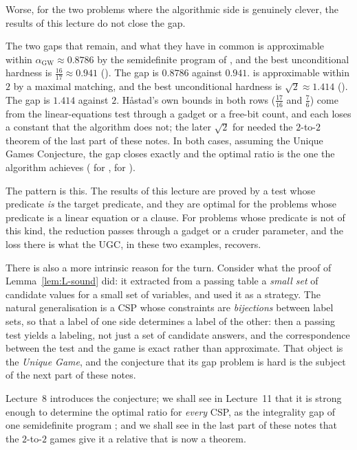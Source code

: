 Worse, for the two problems where the algorithmic side is genuinely clever, the results of this lecture do not close the gap.

\begin{bigpicture}{The two gaps that remain, and what they have in common}
 is approximable within $\alpha_{\mathrm{GW}}\approx0.8786$ by the semidefinite program of \citet{GW95}, and the best unconditional hardness is $\tfrac{16}{17}\approx0.941$ (\citealp{Hastad01,TSSW00}).  The gap is $0.8786$ against $0.941$.
 is approximable within $2$ by a maximal matching, and the best unconditional hardness is $\sqrt2\approx1.414$ (\citealp{DKKMS18,KMS18}).  The gap is $1.414$ against $2$.
H\aa stad's own bounds in both rows ($\tfrac{17}{16}$ and $\tfrac76$) come from the linear-equations test through a gadget or a free-bit count, and each loses a constant that the algorithm does not; the later $\sqrt2$ for  needed the $2$-to-$2$ theorem of the last part of these notes.
In both cases, assuming the Unique Games Conjecture, the gap closes exactly and the optimal ratio is the one the algorithm achieves (\citealp{KKMO07,MOO10} for , \citealp{KhotRegev08} for ).
\end{bigpicture}

\noindent
The pattern is this.  The results of this lecture are proved by a test whose predicate \emph{is} the target predicate, and they are optimal for the problems whose predicate is a linear equation or a clause.  For problems whose predicate is not of this kind, the reduction passes through a gadget or a cruder parameter, and the loss there is what the UGC, in these two examples, recovers.

There is also a more intrinsic reason for the turn.  Consider what the proof of Lemma~\ref{lem:L-sound} did: it extracted from a passing table a \emph{small set} of candidate values for a small set of variables, and used it as a strategy.  The natural generalisation is a CSP whose constraints are \emph{bijections} between label sets, so that a label of one side determines a label of the other: then a passing test yields a labeling, not just a set of candidate answers, and the correspondence between the test and the game is exact rather than approximate.  That object is the \emph{Unique Game}, and the conjecture that its gap problem is hard is the subject of the next part of these notes.

Lecture~8 introduces the conjecture; we shall see in Lecture~11 that it is strong enough to determine the optimal ratio for \emph{every} CSP, as the integrality gap of one semidefinite program \citep{Raghavendra08}; and we shall see in the last part of these notes that the $2$-to-$2$ games give it a relative that is now a theorem.



